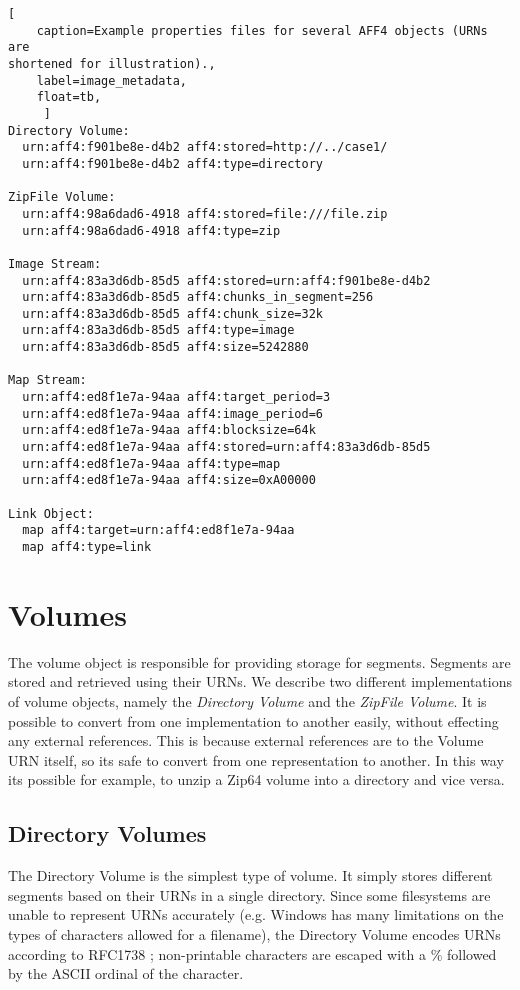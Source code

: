 \documentclass[10pt, conference]{IEEEtran}
\begin{document}
\begin{lstlisting}[
	caption=Example properties files for several AFF4 objects (URNs are
shortened for illustration).,
	label=image_metadata,
	float=tb,
	 ]
Directory Volume:
  urn:aff4:f901be8e-d4b2 aff4:stored=http://../case1/
  urn:aff4:f901be8e-d4b2 aff4:type=directory

ZipFile Volume:
  urn:aff4:98a6dad6-4918 aff4:stored=file:///file.zip
  urn:aff4:98a6dad6-4918 aff4:type=zip

Image Stream:
  urn:aff4:83a3d6db-85d5 aff4:stored=urn:aff4:f901be8e-d4b2
  urn:aff4:83a3d6db-85d5 aff4:chunks_in_segment=256
  urn:aff4:83a3d6db-85d5 aff4:chunk_size=32k
  urn:aff4:83a3d6db-85d5 aff4:type=image
  urn:aff4:83a3d6db-85d5 aff4:size=5242880

Map Stream:
  urn:aff4:ed8f1e7a-94aa aff4:target_period=3
  urn:aff4:ed8f1e7a-94aa aff4:image_period=6
  urn:aff4:ed8f1e7a-94aa aff4:blocksize=64k
  urn:aff4:ed8f1e7a-94aa aff4:stored=urn:aff4:83a3d6db-85d5
  urn:aff4:ed8f1e7a-94aa aff4:type=map
  urn:aff4:ed8f1e7a-94aa aff4:size=0xA00000

Link Object:
  map aff4:target=urn:aff4:ed8f1e7a-94aa
  map aff4:type=link
\end{lstlisting}

\section{Volumes}
The volume object is responsible for providing storage for
segments. Segments are stored and retrieved using their URNs. We
describe two different implementations of volume objects, namely the
{\em Directory Volume} and the {\em ZipFile Volume}. It is possible to
convert from one implementation to another easily, without effecting
any external references. This is because external references are to
the Volume URN itself, so its safe to convert from one representation
to another. In this way its possible for example, to unzip a Zip64
volume into a directory and vice versa.

\subsection{Directory Volumes}
The Directory Volume is the simplest type of volume. It simply stores
different segments based on their URNs in a single directory. Since
some filesystems are unable to represent URNs accurately (e.g. Windows
has many limitations on the types of characters allowed for a
filename), the Directory Volume encodes URNs according to RFC1738
\cite{RFC1738}; non-printable characters are escaped with a \%
followed by the ASCII ordinal of the character.
\end{document}
